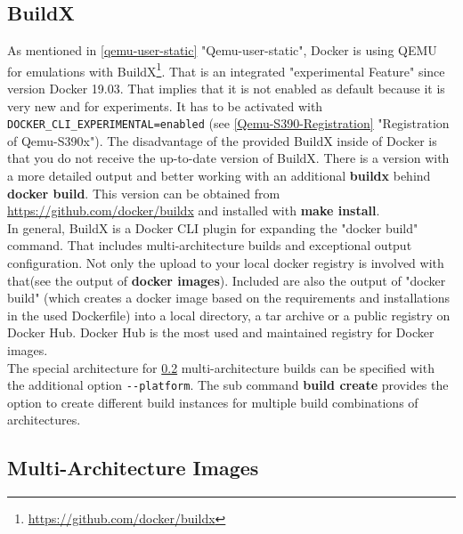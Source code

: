 \subsection{BuildX}\label{BuildX}

As mentioned in \ref{qemu-user-static} "Qemu-user-static", Docker is using \gls{QEMU} for emulations with BuildX\footnote{\url{https://github.com/docker/buildx}}. That is an integrated "experimental Feature" since version Docker 19.03. That implies that it is not enabled as default because it is very new and for experiments. It has to be activated with \lstinline!DOCKER_CLI_EXPERIMENTAL=enabled! (see \ref{Qemu-S390-Registration} "Registration of Qemu-S390x"). The disadvantage of the provided BuildX inside of Docker is that you do not receive the up-to-date version of BuildX. There is a version with a more detailed output and better working with an additional \textbf{buildx} behind \textbf{docker build}. This version can be obtained from \url{https://github.com/docker/buildx} and installed with \textbf{make install}. \\
In general, BuildX is a Docker CLI plugin for expanding the "docker build" command. That includes multi-architecture builds and exceptional output configuration. Not only the upload to your local docker registry is involved with that(see the output of \textbf{docker images}). Included are also the output of "docker build" (which creates a docker image based on the requirements and installations in the used Dockerfile) into a local directory, a tar archive or a public registry on Docker Hub. Docker Hub is the most used and maintained registry for Docker images. \\
The special architecture for \ref{MultiArchitectureImages} multi-architecture builds can be specified with the additional option \verb+--platform+.
The sub command \textbf{build create} provides the option to create different build instances for multiple build combinations of architectures.

\subsection{Multi-Architecture Images}\label{MultiArchitectureImages}

